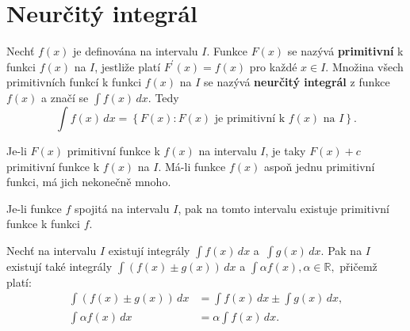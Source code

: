 \section{Neurčitý integrál}
\begin{definition}\label{integral}
Nechť $f(x)$ je definována na intervalu $I$. Funkce $F(x)$ se nazývá \textbf{primitivní}
k funkci $f(x)$ na $I$, jestliže platí $F^\prime(x)=f(x)$ pro každé $x\in I.$
Množina všech primitivních funkcí k funkci $f(x)$ na $I$ se nazývá \textbf{neurčitý
integrál} z funkce $f(x)$ a značí se $\int f(x)\, dx.$ Tedy
$$\int f(x)\, dx= \left \{ F(x):F(x) \textrm{ je primitivní k } f(x) \textrm{ na } I \right \}. $$
\end{definition}

\begin{veta}
    Je-li $F(x)$ primitivní funkce k $f(x)$ na intervalu $I$, je taky
    $F(x)+c$ primitivní funkce k $f(x)$ na $I$. Má-li funkce $f(x)$ aspoň
    jednu primitivní funkci, má jich nekonečně mnoho.
\end{veta}

\begin{veta}
Je-li funkce $f$ spojitá na intervalu $I$, pak na tomto intervalu existuje
primitivní funkce k funkci $f$.
\end{veta}

\begin{veta}
Nechť na intervalu $I$ existují integrály $\int f(x) \, dx$ a~$\int g(x)\, dx.$
Pak na $I$ existují také integrály $\int(f(x)\pm g(x))\, dx$ a $\int \alpha f(x), \alpha \in \mathbb R,$ přičemž platí:
\begin{align*}
\int (f(x)\pm g(x)) \, dx &= \int f(x)\, dx \pm \int g(x) \, dx,\\
\int \alpha f(x)\, dx &= \alpha\int f(x)\, dx.
\end{align*}
\end{veta}

